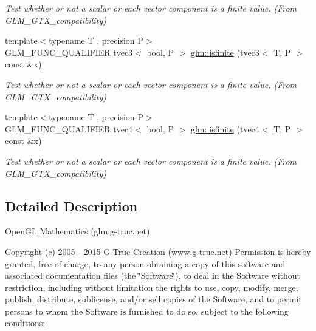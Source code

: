 \begin{DoxyCompactItemize}
\begin{DoxyCompactList}\small\item\em Test whether or not a scalar or each vector component is a finite value. (From G\-L\-M\-\_\-\-G\-T\-X\-\_\-compatibility) \end{DoxyCompactList}\item 
\hypertarget{group__gtx__compatibility_ga1be9593d810fceb278a2854da8a25273}{{\footnotesize template$<$typename T , precision P$>$ }\\G\-L\-M\-\_\-\-F\-U\-N\-C\-\_\-\-Q\-U\-A\-L\-I\-F\-I\-E\-R tvec3$<$ bool, P $>$ \hyperlink{group__gtx__compatibility_ga1be9593d810fceb278a2854da8a25273}{glm\-::isfinite} (tvec3$<$ T, P $>$ const \&x)}\label{group__gtx__compatibility_ga1be9593d810fceb278a2854da8a25273}

\begin{DoxyCompactList}\small\item\em Test whether or not a scalar or each vector component is a finite value. (From G\-L\-M\-\_\-\-G\-T\-X\-\_\-compatibility) \end{DoxyCompactList}\item 
\hypertarget{group__gtx__compatibility_ga8c6a59e2f2ac84fba0c5932f1c35bf7a}{{\footnotesize template$<$typename T , precision P$>$ }\\G\-L\-M\-\_\-\-F\-U\-N\-C\-\_\-\-Q\-U\-A\-L\-I\-F\-I\-E\-R tvec4$<$ bool, P $>$ \hyperlink{group__gtx__compatibility_ga8c6a59e2f2ac84fba0c5932f1c35bf7a}{glm\-::isfinite} (tvec4$<$ T, P $>$ const \&x)}\label{group__gtx__compatibility_ga8c6a59e2f2ac84fba0c5932f1c35bf7a}

\begin{DoxyCompactList}\small\item\em Test whether or not a scalar or each vector component is a finite value. (From G\-L\-M\-\_\-\-G\-T\-X\-\_\-compatibility) \end{DoxyCompactList}\end{DoxyCompactItemize}


\subsection{Detailed Description}
Open\-G\-L Mathematics (glm.\-g-\/truc.\-net)

Copyright (c) 2005 -\/ 2015 G-\/\-Truc Creation (www.\-g-\/truc.\-net) Permission is hereby granted, free of charge, to any person obtaining a copy of this software and associated documentation files (the \char`\"{}\-Software\char`\"{}), to deal in the Software without restriction, including without limitation the rights to use, copy, modify, merge, publish, distribute, sublicense, and/or sell copies of the Software, and to permit persons to whom the Software is furnished to do so, subject to the following conditions\-:

